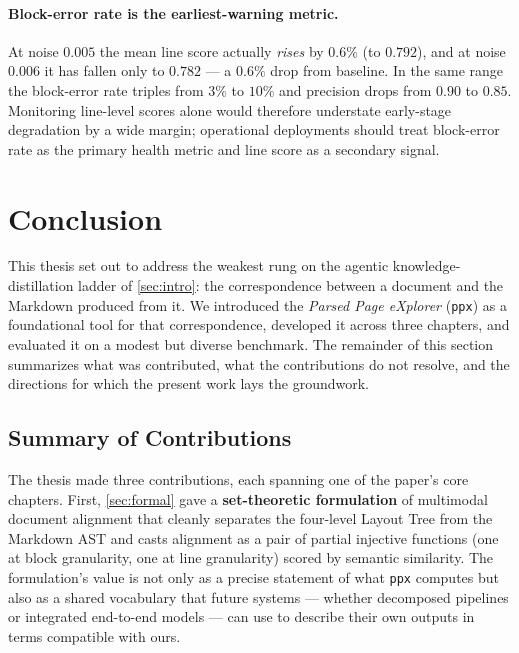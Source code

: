 \documentclass{article}
\theoremstyle{definition}
\begin{document}
\paragraph{Block-error rate is the earliest-warning metric.}  At
noise $0.005$ the mean line score actually \emph{rises} by $0.6\%$
(to $0.792$), and at noise $0.006$ it has fallen only to $0.782$ ---
a $0.6\%$ drop from baseline.  In the same range the block-error
rate triples from $3\%$ to $10\%$ and precision drops from $0.90$
to $0.85$.  Monitoring line-level scores alone would therefore
understate early-stage degradation by a wide margin; operational
deployments should treat block-error rate as the primary health
metric and line score as a secondary signal.

\FloatBarrier

\section{Conclusion}
\label{sec:conclusion}

This thesis set out to address the weakest rung on the agentic
knowledge-distillation ladder of \cref{sec:intro}: the correspondence
between a document and the Markdown produced from it.  We introduced
the \emph{Parsed Page eXplorer} (\texttt{ppx}) as a foundational tool
for that correspondence, developed it across three chapters, and
evaluated it on a modest but diverse benchmark.  The remainder of
this section summarizes what was contributed, what the contributions
do not resolve, and the directions for which the present work lays
the groundwork.

\subsection{Summary of Contributions}

The thesis made three contributions, each spanning one of the
paper's core chapters.  First, \cref{sec:formal} gave a
\textbf{set-theoretic formulation} of multimodal document alignment
that cleanly separates the four-level Layout Tree from the Markdown
AST and casts alignment as a pair of partial injective functions
(one at block granularity, one at line granularity) scored by
semantic similarity.  The formulation's value is not only as a
precise statement of what \texttt{ppx} computes but also as a shared
vocabulary that future systems --- whether decomposed pipelines or
integrated end-to-end models --- can use to describe their own
outputs in terms compatible with ours.
\end{document}

